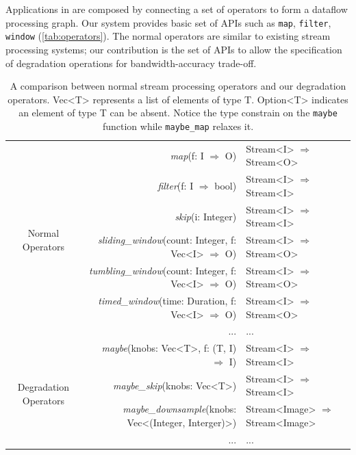 Applications in \sysname{} are composed by connecting a set of operators to form
a dataflow processing graph. Our system provides basic set of APIs such as
\texttt{map}, \texttt{filter}, \texttt{window} (\autoref{tab:operators}). The
normal operators are similar to existing stream processing systems; our
contribution is the set of APIs to allow the specification of degradation
operations for bandwidth-accuracy trade-off.

\begin{table}
  \centering
  \begin{tabular}{ c r l }
    \toprule
    \multirow{7}{*}{Normal Operators}
    & \textit{map}(f: I $\Rightarrow$ O) & Stream<I> $\Rightarrow$ Stream<O> \\
    & \textit{filter}(f: I $\Rightarrow$ bool) & Stream<I> $\Rightarrow$
                                                 Stream<I> \\
    & \textit{skip}(i: Integer) & Stream<I> $\Rightarrow$ Stream<I> \\
    & \textit{sliding\_window}(count: Integer, f: Vec<I> $\Rightarrow$ O) & Stream<I> $\Rightarrow$
                                                                            Stream<O> \\
    & \textit{tumbling\_window}(count: Integer, f: Vec<I> $\Rightarrow$ O) & Stream<I> $\Rightarrow$
                                                                             Stream<O> \\
    & \textit{timed\_window}(time: Duration, f: Vec<I> $\Rightarrow$ O) & Stream<I> $\Rightarrow$
                                                                          Stream<O> \\
    & ... & ... \\
    \midrule
    \multirow{4}{*}{Degradation Operators}
    & \textit{maybe}(knobs: Vec<T>, f: (T, I) $\Rightarrow$ I) & Stream<I> $\Rightarrow$
                                                                 Stream<I> \\
    & \textit{maybe\_skip}(knobs: Vec<T>) & Stream<I> $\Rightarrow$ Stream<I> \\
    & \textit{maybe\_downsample}(knobs: Vec<(Integer, Interger)>) & Stream<Image> $\Rightarrow$ Stream<Image> \\
    & ... & ... \\
    \bottomrule
  \end{tabular}
  \caption{A comparison between normal stream processing operators and our
    degradation operators. Vec<T> represents a list of elements of type
    T. Option<T> indicates an element of type T can be absent. Notice the type
    constrain on the \texttt{maybe} function while \texttt{maybe\_map} relaxes
    it.}
  \label{tab:operators}
\end{table}

